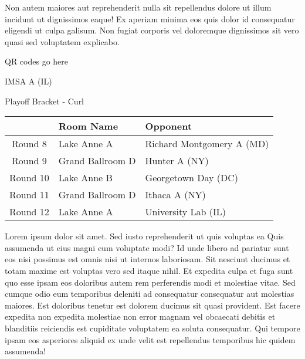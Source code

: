\documentclass{article}%
\begin{document}
\newline%
Non autem maiores aut reprehenderit nulla sit repellendus dolore ut illum incidunt ut dignissimos eaque! Ex aperiam minima eos quis dolor id consequatur eligendi ut culpa galisum. Non fugiat corporis vel doloremque dignissimos sit vero quasi sed voluptatem explicabo.\newline%
\newline%
%
\vspace*{30pt}%
\begin{center}%
\begin{Huge}%
QR codes go here%
\end{Huge}%
\end{center}%
\newpage%
\begin{center}%
\begin{Huge}%
IMSA A (IL)%
\end{Huge}%
\vspace*{8pt}%
\linebreak%
\begin{Large}%
Playoff Bracket {-} Curl%
\end{Large}%
\end{center}%
\begin{tabularx}{\textwidth}{|c|Y|Y|}%
\hline%
&Room Name&Opponent\\%
\hline%
Round 8&Lake Anne A&Richard Montgomery A (MD)\\%
Round 9&Grand Ballroom D&Hunter A (NY)\\%
Round 10&Lake Anne B&Georgetown Day (DC)\\%
Round 11&Grand Ballroom D&Ithaca A (NY)\\%
Round 12&Lake Anne A&University Lab (IL)\\%
\hline%
\end{tabularx}%
\vspace*{8pt}%
\linebreak%
\newline%
\newline%
Lorem ipsum dolor sit amet. Sed iusto reprehenderit ut quis voluptas ea Quis assumenda ut eius magni eum voluptate modi? Id unde libero ad pariatur sunt eos nisi possimus est omnis nisi ut internos laboriosam. Sit nesciunt ducimus et totam maxime est voluptas vero sed itaque nihil. Et expedita culpa et fuga sunt quo esse ipsam eos doloribus autem rem perferendis modi et molestiae vitae.\newline%
\newline%
Sed cumque odio eum temporibus deleniti ad consequatur consequatur aut molestias maiores. Est doloribus tenetur est dolorem ducimus sit quasi provident. Est facere expedita non expedita molestiae non error magnam vel obcaecati debitis et blanditiis reiciendis est cupiditate voluptatem ea soluta consequatur. Qui tempore ipsam eos asperiores aliquid ex unde velit est repellendus temporibus hic quidem assumenda!\newline%
\end{document}
